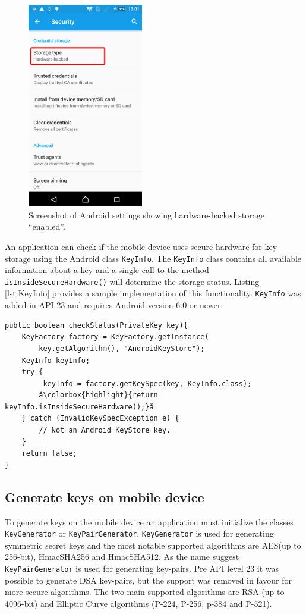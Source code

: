 \begin{figure}[h!]
  \captionsetup{justification=centering,margin=1.5cm}
  \caption{Screenshot of Android settings showing hardware-backed storage ``enabled''.}
  \label{fig:hardwareBacked}
  \centering
    \includegraphics[width=0.45\textwidth]{images/hardwareBacked.png}
\end{figure}
An application can check if the mobile device uses secure hardware for key storage using the Android class \texttt{KeyInfo}. The \texttt{KeyInfo} class contains all available information about a key and a single call to the method \texttt{\allowbreak isInsideSecureHardware()} will determine the storage status. Listing \ref{lst:KeyInfo} provides a sample implementation of this functionality. \texttt{KeyInfo} was added in API 23 and requires Android version 6.0 or newer.


\begin{lstlisting}[caption=Obtaining storage status of keys using KeyInfo., label=lst:KeyInfo,escapechar=å]
public boolean checkStatus(PrivateKey key){
    KeyFactory factory = KeyFactory.getInstance(
        key.getAlgorithm(), "AndroidKeyStore");
    KeyInfo keyInfo;
    try {
         keyInfo = factory.getKeySpec(key, KeyInfo.class);
        å\colorbox{highlight}{return keyInfo.isInsideSecureHardware();}å
    } catch (InvalidKeySpecException e) {
        // Not an Android KeyStore key.
    }
    return false;
}
\end{lstlisting}

\subsection{Generate keys on mobile device}
To generate keys on the mobile device an application must initialize the classes \texttt{KeyGenerator} or \texttt{KeyPairGenerator}. \texttt{KeyGenerator} is used for generating symmetric secret keys and the most notable supported algorithms are AES(up to 256-bit), HmacSHA256 and HmacSHA512. As the name suggest \texttt{KeyPairGenerator} is used for generating key-pairs. Pre API level 23 it was possible to generate DSA key-pairs, but the support was removed in favour for more secure algorithms. The two main supported algorithms are RSA (up to 4096-bit) and Elliptic Curve algorithms (P-224, P-256, p-384 and P-521).

